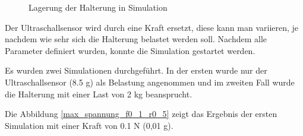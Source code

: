 			\begin{figure}[H]
				\begin{centering}
				\par\end{centering}
				\caption{Lagerung der Halterung in Simulation}
				\label{Lagerung_Halterung}
			\end{figure}

	Der Ultraschallsensor wird durch eine Kraft ersetzt, diese kann man variieren, je nachdem wie sehr sich die Halterung belastet werden soll.
	Nachdem alle Parameter definiert wurden, konnte die Simulation gestartet werden.

	Es wurden zwei Simulationen durchgeführt. In der ersten wurde nur der Ultraschallsensor (8.5 g) als Belastung angenommen und im zweiten Fall  wurde die Halterung mit einer Last von 2 kg beansprucht.

	Die Abbildung \ref{max_spannung_f0_1_r0_5} zeigt das Ergebnis der ersten Simulation mit einer Kraft von 0.1 N (0,01 g).

